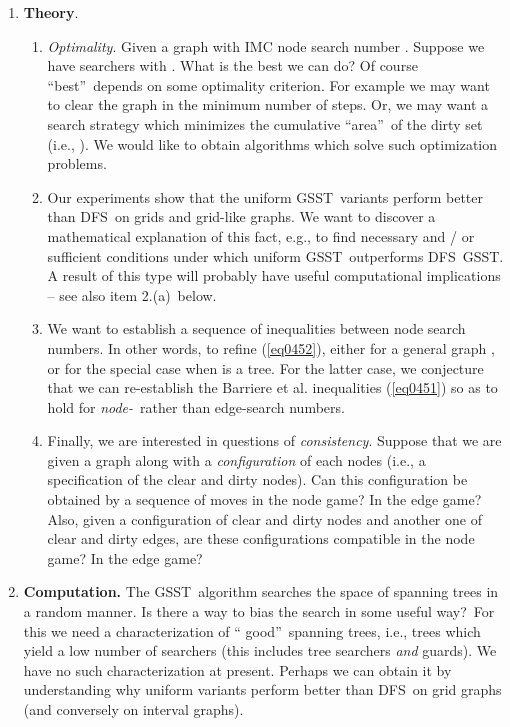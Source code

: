 \documentclass[11pt]{article}\usepackage{amsmath}
\begin{document}
\begin{enumerate}
\item \textbf{Theory}.

\begin{enumerate}
\item \emph{Optimality}. Given a graph  with IMC node search
number . Suppose we have  searchers
with . What is the best we can
do? Of course \textquotedblleft best\textquotedblright\ depends on some
optimality criterion. For example we may want to clear the graph in the
minimum number of steps. Or, we may want a search strategy which minimizes the
cumulative \textquotedblleft area\textquotedblright\ of the dirty set (i.e.,
). We would like to obtain
algorithms which solve such optimization problems.

\item Our experiments show that the uniform GSST\ variants perform better than
DFS\ on grids and grid-like graphs. We want to discover a mathematical
explanation of this fact, e.g., to find necessary and / or sufficient
conditions under which uniform GSST\ outperforms DFS\ GSST. A result of this
type will probably have useful computational implications -- see also item 2.(a)\ below.\ 

\item We want to establish a sequence of inequalities between node search
numbers. In other words, to refine (\ref{eq0452}), either for a general graph
, or for the special case when  is a tree. For the
latter case, we conjecture that we can re-establish the Barriere et al.
inequalities (\ref{eq0451}) so as to hold for \emph{node-}\ rather than
edge-search numbers.

\item Finally, we are interested in questions of \emph{consistency}. Suppose
that we are given a graph along with a \emph{configuration} of each nodes
(i.e., a specification of the clear and dirty nodes). Can this configuration
be obtained by a sequence of moves in the node game? In the edge game? Also,
given a configuration of clear and dirty nodes and another one of clear and
dirty edges, are these configurations compatible in the node game? In the edge game?
\end{enumerate}

\item \textbf{Computation. }The GSST\ algorithm searches the space of spanning
trees in a random manner. Is there a way to bias the search in some useful
way?\ For this we need a characterization of \textquotedblleft
good\textquotedblright\ spanning trees, i.e., trees which yield a low number
of searchers (this includes tree searchers \emph{and} guards). We have no such
characterization at present. Perhaps we can obtain it by understanding why
uniform variants perform better than DFS\ on grid graphs (and conversely on
interval graphs).


\end{enumerate}
\end{document}
